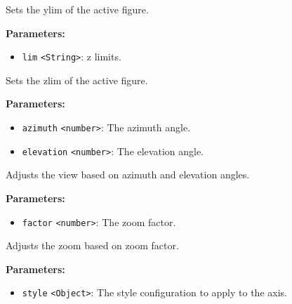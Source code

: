 \documentclass[12pt,a4paper]{article}
\begin{document}
\noindent Sets the ylim of the active figure.

\vspace{5mm}
\noindent {}


\noindent \textbf{Parameters:}
\begin{itemize}
  \item \texttt{lim} \texttt{<String>}: z limits.
\end{itemize}

\noindent Sets the zlim of the active figure.

\vspace{5mm}
\noindent {}


\noindent \textbf{Parameters:}
\begin{itemize}
  \item \texttt{azimuth} \texttt{<number>}: The azimuth angle.
  \item \texttt{elevation} \texttt{<number>}: The elevation angle.
\end{itemize}

\noindent Adjusts the view based on azimuth and elevation angles.

\vspace{5mm}
\noindent {}


\noindent \textbf{Parameters:}
\begin{itemize}
  \item \texttt{factor} \texttt{<number>}: The zoom factor.
\end{itemize}

\noindent Adjusts the zoom based on zoom factor.

\vspace{5mm}
\noindent {}


\noindent \textbf{Parameters:}
\begin{itemize}
  \item \texttt{style} \texttt{<Object>}: The style configuration to apply to the axis.
\end{itemize}
\end{document}
